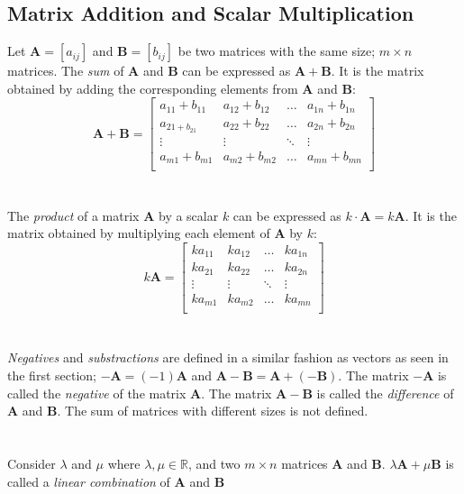 \documentclass[../setup.tex]{subfiles}
\begin{document}
\subsection{Matrix Addition and Scalar Multiplication}
Let $\bm{A} = [a_{ij}]$ and $\bm{B} = [b_{ij}]$ be two matrices with the same size; $m \times n$ matrices. The \textit{sum} of $\bm{A}$ and $\bm{B}$ can be expressed as $\bm{A} + \bm{B}$. It is the matrix obtained by adding the corresponding elements from $\bm{A}$ and $\bm{B}$:
\[\bm{A} + \bm{B} =
\begin{bmatrix}
	a_{11} + b_{11} & a_{12} + b_{12}& \dots & a_{1n} + b_{1n} \\
	a_{21 + b_{21}} & a_{22} + b_{22} & \dots & a_{2n} + b_{2n} \\
	\vdots & \vdots & \ddots & \vdots \\
	a_{m1} + b_{m1} & a_{m2} + b_{m2} & \dots & a_{mn} + b_{mn}\\
\end{bmatrix}
\]
\phantom \\ \\
The \textit{product} of a matrix $\bm{A}$ by a scalar $k$ can be expressed as $k \cdot \bm{A} = k\bm{A}$. It is the matrix obtained by multiplying each element of $\bm{A}$ by $k$: 
\[k\bm{A} =
\begin{bmatrix}
	ka_{11} & ka_{12} & \dots & ka_{1n} \\
	ka_{21} & ka_{22} & \dots & ka_{2n} \\
	\vdots & \vdots & \ddots & \vdots \\
	ka_{m1} & ka_{m2} & \dots & ka_{mn} \\
\end{bmatrix}
\]
\phantom \\ \\
\textit{Negatives} and \textit{substractions} are defined in a similar fashion as vectors as seen in the first section; $-\bm{A} = (-1)\bm{A}$ and $\bm{A} - \bm{B} = \bm{A} + (-\bm{B})$. The matrix $-\bm{A}$ is called the \textit{negative} of the matrix $\bm{A}$. The matrix $\bm{A} - \bm{B}$ is called the \textit{difference} of $\bm{A}$ and $\bm{B}$. The sum of matrices with different sizes is not defined. \\
\phantom \\ \\
Consider $\lambda$ and $\mu$ where $\lambda, \mu \in \mathbb{R}$, and two $m \times n$ matrices $\bm{A}$ and $\bm{B}$. $\lambda\bm{A} + \mu\bm{B}$ is called a \textit{linear combination} of $\bm{A}$ and $\bm{B}$
\phantom \\ \\
\end{document}
